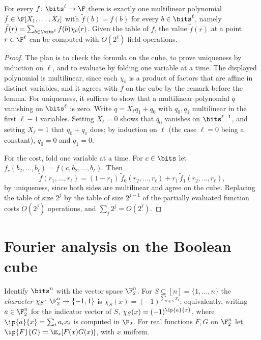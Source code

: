 \begin{refsection}
\begin{lemma}\label{lem:toolkit:mle}
For every $f\colon\bits^\ell\to\F$ there is exactly one multilinear polynomial $\tilde f\in\F[X_1,\dots,X_\ell]$ with $\tilde f(b)=f(b)$ for every $b\in\bits^\ell$, namely $\tilde f(r)=\sum_{b\in\bits^\ell}f(b)\chi_b(r)$. Given the table of $f$, the value $\tilde f(r)$ at a point $r\in\F^\ell$ can be computed with $O(2^\ell)$ field operations.
\end{lemma}

\begin{proof}
The plan is to check the formula on the cube, to prove uniqueness by induction on $\ell$, and to evaluate by folding one variable at a time. The displayed polynomial is multilinear, since each $\chi_b$ is a product of factors that are affine in distinct variables, and it agrees with $f$ on the cube by the remark before the lemma. For uniqueness, it suffices to show that a multilinear polynomial $q$ vanishing on $\bits^\ell$ is zero. Write $q=X_\ell q_1+q_0$ with $q_0,q_1$ multilinear in the first $\ell-1$ variables. Setting $X_\ell=0$ shows that $q_0$ vanishes on $\bits^{\ell-1}$, and setting $X_\ell=1$ that $q_0+q_1$ does; by induction on $\ell$ (the case $\ell=0$ being a constant), $q_0=0$ and $q_1=0$.

For the cost, fold one variable at a time. For $c\in\bits$ let $f_c(b_2,\dots,b_\ell)=f(c,b_2,\dots,b_\ell)$. Then
\[
\tilde f(r_1,\dots,r_\ell)=(1-r_1)\,\tilde f_0(r_2,\dots,r_\ell)+r_1\,\tilde f_1(r_2,\dots,r_\ell),
\]
by uniqueness, since both sides are multilinear and agree on the cube. Replacing the table of size $2^j$ by the table of size $2^{j-1}$ of the partially evaluated function costs $O(2^j)$ operations, and $\sum_j2^j=O(2^\ell)$.
\end{proof}

\section{Fourier analysis on the Boolean cube}\label{sec:toolkit:fourier}

Identify $\bits^n$ with the vector space $\F_2^n$. For $S\subseteq[n]=\{1,\dots,n\}$ the \emph{character} $\chi_S\colon\F_2^n\to\{-1,1\}$ is $\chi_S(x)=(-1)^{\sum_{i\in S}x_i}$; equivalently, writing $a\in\F_2^n$ for the indicator vector of $S$, $\chi_S(x)=(-1)^{\ip{a}{x}}$, where $\ip{a}{x}=\sum_ia_ix_i$ is computed in $\F_2$. For real functions $F,G$ on $\F_2^n$ let $\ip{F}{G}=\E_x[F(x)G(x)]$, with $x$ uniform.


\end{refsection}
